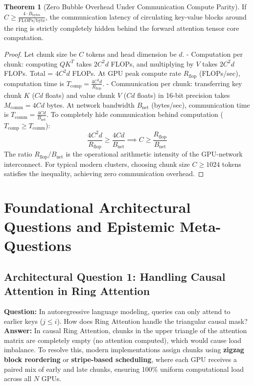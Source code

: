 \documentclass[11pt,a4paper]{article}
\theoremstyle{definition}
\newtheorem{theorem}{\textbf{Theorem}}[section]
\begin{document}
\begin{theorem}[Zero Bubble Overhead Under Communication Compute Parity]
If $C \ge \frac{4 \cdot B_{\text{bytes}}}{\text{FLOPs/byte}}$, the communication latency of circulating key-value blocks around the ring is strictly completely hidden behind the forward attention tensor core computation.
\end{theorem}

\begin{proof}
Let chunk size be $C$ tokens and head dimension be $d$.
- Computation per chunk: computing $Q K^T$ takes $2 C^2 d$ FLOPs, and multiplying by $V$ takes $2 C^2 d$ FLOPs. Total = $4 C^2 d$ FLOPs.
At GPU peak compute rate $R_{\text{flop}}$ (FLOPs/sec), computation time is $T_{\text{comp}} = \frac{4 C^2 d}{R_{\text{flop}}}$.
- Communication per chunk: transferring key chunk $K$ ($C d$ floats) and value chunk $V$ ($C d$ floats) in 16-bit precision takes $M_{\text{comm}} = 4 C d$ bytes.
At network bandwidth $B_{\text{net}}$ (bytes/sec), communication time is $T_{\text{comm}} = \frac{4 C d}{B_{\text{net}}}$.
To completely hide communication behind computation ($T_{\text{comp}} \ge T_{\text{comm}}$):
{\boldmath
\begin{equation}
\frac{4 C^2 d}{R_{\text{flop}}} \ge \frac{4 C d}{B_{\text{net}}} \implies C \ge \frac{R_{\text{flop}}}{B_{\text{net}}}
\end{equation}
}
The ratio $R_{\text{flop}} / B_{\text{net}}$ is the operational arithmetic intensity of the GPU-network interconnect. For typical modern clusters, choosing chunk size $C \ge 1024$ tokens satisfies the inequality, achieving zero communication overhead.
\end{proof}

\section{Foundational Architectural Questions and Epistemic Meta-Questions}

\subsection{Architectural Question 1: Handling Causal Attention in Ring Attention}
\textbf{Question:} In autoregressive language modeling, queries can only attend to earlier keys ($j \le i$). How does Ring Attention handle the triangular causal mask?\\
\textbf{Answer:} In causal Ring Attention, chunks in the upper triangle of the attention matrix are completely empty (no attention computed), which would cause load imbalance. To resolve this, modern implementations assign chunks using \textbf{zigzag block reordering} or \textbf{stripe-based scheduling}, where each GPU receives a paired mix of early and late chunks, ensuring 100\% uniform computational load across all $N$ GPUs.
\end{document}
